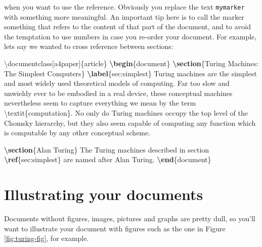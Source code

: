 \documentclass[
]{book}
\newenvironment{Shaded}{\begin{snugshade}}{\end{snugshade}}
\newcommand{\BuiltInTok}[1]{#1}
\newcommand{\ExtensionTok}[1]{#1}
\newcommand{\FunctionTok}[1]{\textcolor[rgb]{0.00,0.00,0.00}{#1}}
\newcommand{\KeywordTok}[1]{\textcolor[rgb]{0.13,0.29,0.53}{\textbf{#1}}}
\newcommand{\NormalTok}[1]{#1}
\begin{document}
when you want to use the reference. Obviously you replace the text \texttt{mymarker} with something more meaningful. An important tip here is to call the marker something that refers to the content of that part of the document, and to avoid the temptation to use numbers in case you re-order your document. For example, lets say we wanted to cross reference between sections:

\begin{Shaded}
\begin{Highlighting}[]
\BuiltInTok{\textbackslash{}documentclass}\NormalTok{[a4paper]\{}\ExtensionTok{article}\NormalTok{\}}
\KeywordTok{\textbackslash{}begin}\NormalTok{\{}\ExtensionTok{document}\NormalTok{\}}
\KeywordTok{\textbackslash{}section}\NormalTok{\{Turing Machines: The Simplest Computers\}}
\KeywordTok{\textbackslash{}label}\NormalTok{\{}\ExtensionTok{sec:simplest}\NormalTok{\}}
\NormalTok{Turing machines are the simplest and most widely used theoretical models of computing. Far too slow and unwieldy ever to be embodied in a real device, these conceptual machines nevertheless seem to capture everything we mean by the term }\FunctionTok{\textbackslash{}textit}\NormalTok{\{computation\}. No only do Turing machines occupy the top level of the Chomsky hierarchy, but they also seem capable of computing any function which is computable by any other conceptual scheme.}

\KeywordTok{\textbackslash{}section}\NormalTok{\{Alan Turing\}}
\NormalTok{The Turing machines described in section }\KeywordTok{\textbackslash{}ref}\NormalTok{\{}\ExtensionTok{sec:simplest}\NormalTok{\} are named after Alan Turing.}
\KeywordTok{\textbackslash{}end}\NormalTok{\{}\ExtensionTok{document}\NormalTok{\}}
\end{Highlighting}
\end{Shaded}

\hypertarget{illustrating-your-documents}{%
\section{Illustrating your documents}\label{illustrating-your-documents}}

Documents without figures, images, pictures and graphs are pretty dull, so you'll want to illustrate your document with figures such as the one in Figure \ref{fig:turing-fig}, for example.
\end{document}
